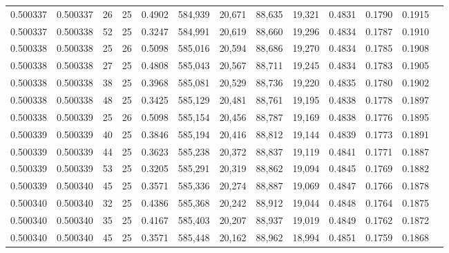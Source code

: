\begin{tabular}{rrrrrrrrrrrrr}
0.500337 & 0.500337 &    26 &  25 &                                     0.4902 & 584,939 &  20,671 &  88,635 &  19,321 & 0.4831 & 0.1790 & 0.1915 \\
0.500337 & 0.500338 &    52 &  25 &                                     0.3247 & 584,991 &  20,619 &  88,660 &  19,296 & 0.4834 & 0.1787 & 0.1910 \\
0.500338 & 0.500338 &    25 &  26 &                                     0.5098 & 585,016 &  20,594 &  88,686 &  19,270 & 0.4834 & 0.1785 & 0.1908 \\
0.500338 & 0.500338 &    27 &  25 &                                     0.4808 & 585,043 &  20,567 &  88,711 &  19,245 & 0.4834 & 0.1783 & 0.1905 \\
0.500338 & 0.500338 &    38 &  25 &                                     0.3968 & 585,081 &  20,529 &  88,736 &  19,220 & 0.4835 & 0.1780 & 0.1902 \\
0.500338 & 0.500338 &    48 &  25 &                                     0.3425 & 585,129 &  20,481 &  88,761 &  19,195 & 0.4838 & 0.1778 & 0.1897 \\
0.500338 & 0.500339 &    25 &  26 &                                     0.5098 & 585,154 &  20,456 &  88,787 &  19,169 & 0.4838 & 0.1776 & 0.1895 \\
0.500339 & 0.500339 &    40 &  25 &                                     0.3846 & 585,194 &  20,416 &  88,812 &  19,144 & 0.4839 & 0.1773 & 0.1891 \\
0.500339 & 0.500339 &    44 &  25 &                                     0.3623 & 585,238 &  20,372 &  88,837 &  19,119 & 0.4841 & 0.1771 & 0.1887 \\
0.500339 & 0.500339 &    53 &  25 &                                     0.3205 & 585,291 &  20,319 &  88,862 &  19,094 & 0.4845 & 0.1769 & 0.1882 \\
0.500339 & 0.500340 &    45 &  25 &                                     0.3571 & 585,336 &  20,274 &  88,887 &  19,069 & 0.4847 & 0.1766 & 0.1878 \\
0.500340 & 0.500340 &    32 &  25 &                                     0.4386 & 585,368 &  20,242 &  88,912 &  19,044 & 0.4848 & 0.1764 & 0.1875 \\
0.500340 & 0.500340 &    35 &  25 &                                     0.4167 & 585,403 &  20,207 &  88,937 &  19,019 & 0.4849 & 0.1762 & 0.1872 \\
0.500340 & 0.500340 &    45 &  25 &                                     0.3571 & 585,448 &  20,162 &  88,962 &  18,994 & 0.4851 & 0.1759 & 0.1868 \\

\end{tabular}
